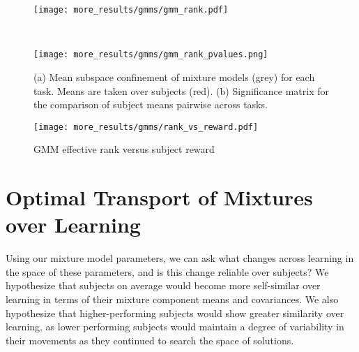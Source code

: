 \documentclass[../main.tex]{subfiles}
\begin{document}
\begin{figure}[!htb]
  \begin{minipage}{\textwidth}
    \centering
    \texttt{[image: more\_results/gmms/gmm\_rank.pdf]}
    \subcaption{}
  \end{minipage}\\%
  \begin{minipage}{\textwidth}
    \centering
    \texttt{[image: more\_results/gmms/gmm\_rank\_pvalues.png]}
    \subcaption{}
  \end{minipage}
  \caption[Mixture subspace confinement over subjects]{(a) Mean subspace confinement of mixture models (grey) for each task. Means are taken over subjects (red). (b) Significance matrix for the comparison of subject means pairwise across tasks.}\label{fig:gmm_rank}
\end{figure}

\begin{figure}[!htb]
  \centering
    \texttt{[image: more\_results/gmms/rank\_vs\_reward.pdf]}
    \caption[Mixture subspace confinement versus mean reward]{GMM effective rank versus subject reward}\label{fig:rank_vs_reward}
\end{figure}












\section{Optimal Transport of Mixtures over Learning}

Using our mixture model parameters, we can ask what changes across learning in the space of these parameters, and is this change reliable over subjects? We hypothesize that subjects on average would become more self-similar over learning in terms of their mixture component means and covariances. We also hypothesize that higher-performing subjects would show greater similarity over learning, as lower performing subjects would maintain a degree of variability in their movements as they continued to search the space of solutions.
\end{document}

